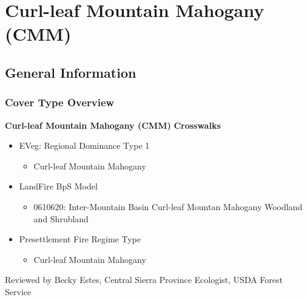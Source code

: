 \newpage
\section{Curl-leaf Mountain Mahogany (CMM)}
\label{cmm-description}

\subsection*{General Information}

\subsubsection*{Cover Type Overview}

\textbf{Curl-leaf Mountain Mahogany (CMM)}
\newline
\textbf{Crosswalks}
\begin{itemize}
	\item EVeg: Regional Dominance Type 1
	\begin{itemize}
		\item Curl-leaf Mountain Mahogany
	\end{itemize}

	\item LandFire BpS Model
	\begin{itemize}
		\item 0610620: Inter-Mountain Basin Curl-leaf Mountan Mahogany Woodland and Shrubland
	\end{itemize}

	\item Presettlement Fire Regime Type
	\begin{itemize}
		\item Curl-leaf Mountain Mahogany
	\end{itemize}
\end{itemize}

\noindent Reviewed by Becky Estes, Central Sierra Province Ecologist, USDA Forest Service

